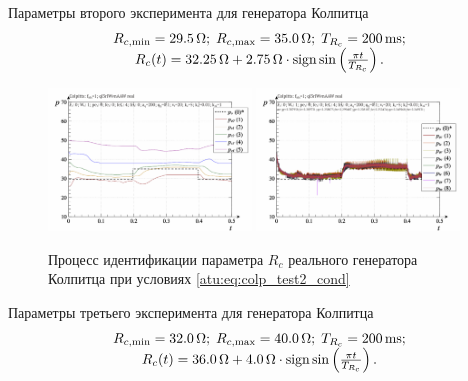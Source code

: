 Параметры второго эксперимента для генератора Колпитца
%
\begin{equation}
  \begin{array}{c}
    R_{c,\min} = \SI{29.5}{\ohm};
    \;
    R_{c,\max} = \SI{35.0}{\ohm};
    \;
    T_{R_c} = \SI{200}{\milli\second};
  \\
    R_c(t) = \SI{32.25}{\ohm} + \SI{2.75}{\ohm} \cdot \operatorname*{sign} \sin \left( \frac{\pi t}{T_{R_c}}  \right).
  \end{array}
  \label{atu:eq:colp_test2_cond}
\end{equation}

\begin{figure}[htb!]
  \centerline{
    \includegraphics[width=0.48\textwidth]{p/r/colp_real_id-p_t_pi_ql3rlWvnAAW_real_d_1.png}
    \hfill
    \includegraphics[width=0.48\textwidth]{p/r/colp_real_id-p_t_p_ql3rlWvnAAW_real_d_1.png}
  }
  \caption{Процесс идентификации параметра $R_c$ реального генератора Колпитца при условиях \ref{atu:eq:colp_test2_cond} }
  \label{atu:f:colp_r_id_2}
\end{figure}


Параметры третьего эксперимента для генератора Колпитца
%
\begin{equation}
  \begin{array}{c}
    R_{c,\min} = \SI{32.0}{\ohm};
    \;
    R_{c,\max} = \SI{40.0}{\ohm};
    \;
    T_{R_c} = \SI{200}{\milli\second};
  \\
    R_c(t) = \SI{36.0}{\ohm} + \SI{4.0}{\ohm} \cdot \operatorname*{sign} \sin \left(   \frac{\pi t}{T_{R_c}}   \right).
  \end{array}
  \label{atu:eq:colp_test3_cond}
\end{equation}


